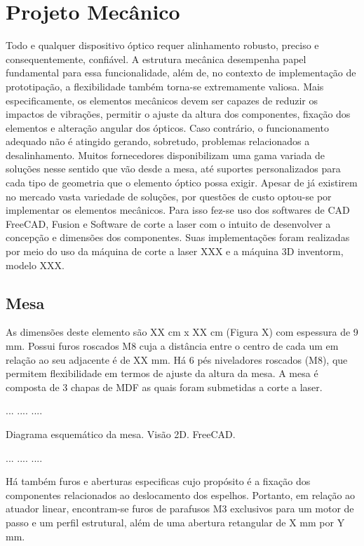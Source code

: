 \documentclass[oneside,openright,12pt]{ufsm_2021} %
\begin{document}
    \section{Projeto Mecânico}
        \par Todo e qualquer dispositivo óptico requer alinhamento robusto, preciso e consequentemente, confiável. A estrutura mecânica desempenha papel fundamental para essa funcionalidade, além de, no contexto de implementação de prototipação, a flexibilidade também torna-se extremamente valiosa. Mais especificamente, os elementos mecânicos devem ser capazes de reduzir os impactos de vibrações, permitir o ajuste da altura dos componentes, fixação dos elementos e alteração angular dos ópticos. Caso contrário, o funcionamento adequado não é atingido gerando, sobretudo, problemas relacionados a desalinhamento. Muitos fornecedores disponibilizam uma gama variada de soluções nesse sentido que vão desde a mesa, até suportes personalizados para cada tipo de geometria que o elemento óptico possa exigir. Apesar de já existirem no mercado vasta variedade de soluções, por questões de custo optou-se por implementar os elementos mecânicos. Para isso fez-se uso dos softwares de CAD FreeCAD, Fusion e Software de corte a laser com o intuito de desenvolver a concepção e dimensões dos componentes. Suas implementações foram realizadas por meio do uso da máquina de corte a laser XXX e a máquina 3D inventorm, modelo XXX.
        
        \subsection{Mesa}
            \par As dimensões deste elemento são XX cm x XX cm (Figura X) com espessura de 9 mm. Possui furos roscados M8 cuja a distância entre o centro de cada um em relação ao seu adjacente é de XX mm. Há 6 pés niveladores roscados (M8), que permitem flexibilidade em termos de ajuste da altura da mesa. A mesa é composta de 3 chapas de MDF as quais foram submetidas a corte a laser.
            \par ...    ....    ....
            \par Diagrama esquemático da mesa. Visão 2D. FreeCAD.
            \par ...    ....    ....
            \par Há também furos e aberturas especificas cujo propósito é a fixação dos componentes relacionados ao deslocamento dos espelhos. Portanto, em relação ao atuador linear, encontram-se furos de parafusos M3 exclusivos para um motor de passo e um perfil estrutural, além de uma abertura retangular de X mm por Y mm.
            
\end{document}
